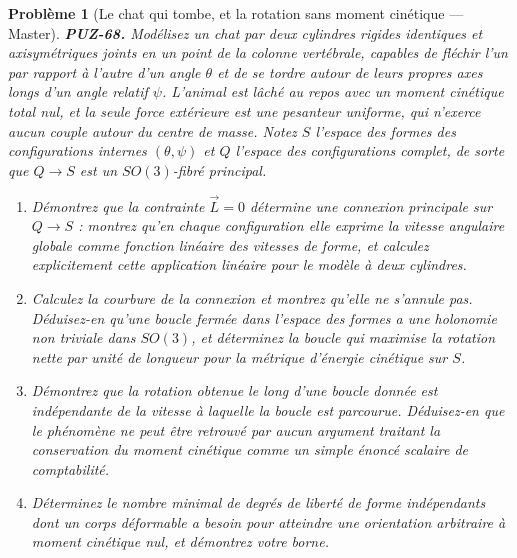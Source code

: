 \documentclass[11pt]{article}
\newtheorem{problem}{Problème}
\begin{document}
\begin{problem}[{Le chat qui tombe, et la rotation sans moment cinétique --- Master}]
\textbf{PUZ-68.} Modélisez un chat par deux cylindres rigides identiques et axisymétriques
joints en un point de la colonne vertébrale, capables de fléchir l'un par rapport à l'autre
d'un angle $ \theta $ et de se tordre autour de leurs propres axes longs d'un angle relatif
$ \psi $. L'animal est lâché au repos avec un moment cinétique total nul, et la seule force
extérieure est une pesanteur uniforme, qui n'exerce aucun couple autour du centre de masse.
Notez $ S $ l'espace des formes des configurations internes $ (\theta,\psi) $ et $ Q $
l'espace des configurations complet, de sorte que $ Q \to S $ est un
$ SO(3) $-fibré principal.
\begin{enumerate}
\item[(a)] Démontrez que la contrainte $ \vec{L} = 0 $ détermine une connexion principale sur
$ Q \to S $ : montrez qu'en chaque configuration elle exprime la vitesse angulaire globale
comme fonction linéaire des vitesses de forme, et calculez explicitement cette application
linéaire pour le modèle à deux cylindres.
\item[(b)] Calculez la courbure de la connexion et montrez qu'elle ne s'annule pas. Déduisez-en
qu'une boucle fermée dans l'espace des formes a une holonomie non triviale dans
$ SO(3) $, et déterminez la boucle qui maximise la rotation nette par unité de longueur
pour la métrique d'énergie cinétique sur $ S $.
\item[(c)] Démontrez que la rotation obtenue le long d'une boucle donnée est indépendante de la
vitesse à laquelle la boucle est parcourue. Déduisez-en que le phénomène ne peut être retrouvé
par aucun argument traitant la conservation du moment cinétique comme un simple énoncé
scalaire de comptabilité.
\item[(d)] Déterminez le nombre minimal de degrés de liberté de forme indépendants dont un corps
déformable a besoin pour atteindre une orientation arbitraire à moment cinétique nul, et
démontrez votre borne.
\end{enumerate}

\end{problem}
\end{document}
